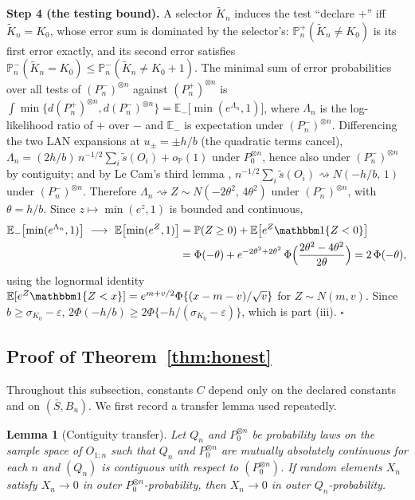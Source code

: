 \documentclass[11pt]{article}
\newtheorem{lemma}{Lemma}
\newcommand{\E}{\mathbb E}
\newcommand{\Pp}{\mathbb P}
\newcommand{\ind}[1]{\mathbbm 1\{#1\}}
\newcommand{\opro}{o_{\Pp}}
\newcommand{\dto}{\rightsquigarrow}
\newcommand{\eps}{\varepsilon}
\begin{document}
\textbf{Step 4 (the testing bound).}
A selector $\widetilde K_n$ induces the test ``declare $+$'' iff $\widetilde K_n=K_0$, whose error sum is dominated by the selector's:
$\Pp^{+}_n(\widetilde K_n\ne K_0)$ is its first error exactly, and its second error satisfies $\Pp^{-}_n(\widetilde K_n=K_0)\le\Pp^{-}_n(\widetilde K_n\ne K_0+1)$.  The minimal sum of error probabilities over all tests of $(P^{-}_n)^{\otimes n}$ against $(P^{+}_n)^{\otimes n}$ is $\int\min\{d(P^{+}_n)^{\otimes n},d(P^{-}_n)^{\otimes n}\}=\E_{-}\bigl[\min(e^{\Lambda_n},1)\bigr]$, where $\Lambda_n$ is the log-likelihood ratio of $+$ over $-$ and $\E_{-}$ is expectation under $(P^{-}_n)^{\otimes n}$.  Differencing the two LAN expansions at $u_\pm=\pm h/b$ (the quadratic terms cancel),
$\Lambda_n=(2h/b)\,n^{-1/2}\sum_i\tilde s(O_i)+\opro(1)$ under $P_0^{\otimes n}$, hence also under $(P^{-}_n)^{\otimes n}$ by contiguity; and by Le Cam's third lemma \citep[Example~6.7]{vandervaart1998}, $n^{-1/2}\sum_i\tilde s(O_i)\dto N(-h/b,\,1)$ under $(P^{-}_n)^{\otimes n}$.  Therefore $\Lambda_n\dto Z\sim N(-2\theta^2,\,4\theta^2)$ under $(P^{-}_n)^{\otimes n}$, with $\theta=h/b$.  Since $z\mapsto\min(e^z,1)$ is bounded and continuous,
\begin{align*}
\E_{-}\bigl[\min(e^{\Lambda_n},1)\bigr]
\ \longrightarrow\
\E\bigl[\min(e^{Z},1)\bigr]
&=\Pp(Z\ge0)+\E\bigl[e^{Z}\ind{Z<0}\bigr]\\
&=\Phi(-\theta)+e^{-2\theta^2+2\theta^2}\,\Phi\Bigl(\frac{2\theta^2-4\theta^2}{2\theta}\Bigr)
=2\,\Phi(-\theta),
\end{align*}
using the lognormal identity $\E[e^{Z}\ind{Z<x}]=e^{m+v/2}\Phi\{(x-m-v)/\sqrt v\}$ for $Z\sim N(m,v)$.  Since $b\ge\sigma_{K_0}-\eps$, $2\Phi(-h/b)\ge2\Phi\{-h/(\sigma_{K_0}-\eps)\}$, which is part (iii). \hfill$\square$

\subsection{Proof of Theorem~\ref{thm:honest}}\label{app:honest}

Throughout this subsection, constants $C$ depend only on the declared constants and on $(\bar S,B_u)$. We first record a transfer lemma used repeatedly.

\begin{lemma}[Contiguity transfer]\label{lem:transfer}
Let $Q_n$ and $P_0^{\otimes n}$ be probability laws on the sample space of $O_{1:n}$ such that $Q_n$ and $P_0^{\otimes n}$ are mutually absolutely continuous for each $n$ and $(Q_n)$ is contiguous with respect to $(P_0^{\otimes n})$. If random elements $X_n$ satisfy $X_n\to0$ in outer $P_0^{\otimes n}$-probability, then $X_n\to0$ in outer $Q_n$-probability.
\end{lemma}
\end{document}
